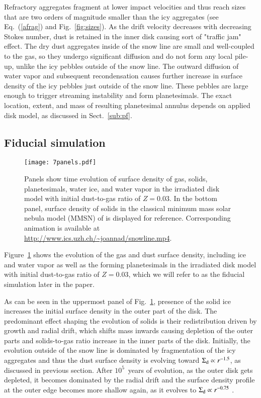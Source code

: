 \documentclass{aa}
\begin{document}
Refractory aggregates fragment at lower impact velocities and thus reach sizes that are two orders of magnitude smaller than the icy aggregates (see Eq.~(\ref{afrag}) and Fig.~\ref{fig:sizes}). As the drift velocity decreases with decreasing Stokes number, dust is retained in the inner disk causing sort of "traffic jam" effect. The dry dust aggregates inside of the snow line are small and well-coupled to the gas, so they undergo significant diffusion and do not form any local pile-up, unlike the icy pebbles outside of the snow line. The outward diffusion of water vapor and subsequent recondensation causes further increase in surface density of the icy pebbles just outside of the snow line. These pebbles are large enough to trigger streaming instability and form planetesimals. The exact location, extent, and mass of resulting planetesimal annulus depends on applied disk model, as discussed in Sect.~\ref{sub:pf}. 

\subsection{Fiducial simulation}

\begin{figure}
   \centering
   \texttt{[image: 7panels.pdf]}
      \caption{Panels show time evolution of surface density of gas, solids, planetesimals, water ice, and water vapor in the irradiated disk model with initial dust-to-gas ratio of $Z = 0.03$. In the bottom panel, surface density of solids in the classical minimum mass solar nebula model (MMSN) of \citet{1977Ap&SS..51..153W} is displayed for reference. Corresponding animation is available at {\url{http://www.ics.uzh.ch/\~joannad/snowline.mp4}.}}
      \label{fig:7panels}
\end{figure}

Figure~\ref{fig:7panels} shows the evolution of the gas and dust surface density, including ice and water vapor as well as the forming planetesimals in the irradiated disk model with initial dust-to-gas ratio of $Z = 0.03$, which we will refer to as the fiducial simulation later in the paper.

As can be seen in the uppermost panel of Fig.~\ref{fig:7panels}, presence of the solid ice increases the initial surface density in the outer part of the disk.
The predominant effect shaping the evolution of solids is their redistribution driven by growth and radial drift, which shifts mass inwards causing depletion of the outer parts and solids-to-gas ratio increase in the inner parts of the disk. 
Initially, the evolution outside of the snow line is dominated by fragmentation of the icy aggregates and thus the dust surface density is evolving toward $\Sigma_{\rm d}\propto r^{-1.5}$, as discussed in previous section. After $10^5$~years of evolution, as the outer disk gets depleted, it becomes dominated by the radial drift and the surface density profile at the outer edge becomes more shallow again, as it evolves to $\Sigma_{\rm d}\propto r^{-0.75}$ \citep{2012A&A...539A.148B}.
\end{document}
